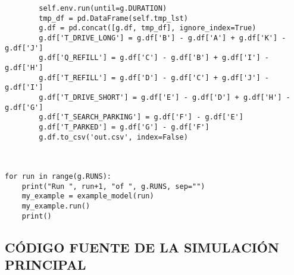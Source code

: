 \begin{verbatim}
        self.env.run(until=g.DURATION)
        tmp_df = pd.DataFrame(self.tmp_lst)
        g.df = pd.concat([g.df, tmp_df], ignore_index=True)
        g.df['T_DRIVE_LONG'] = g.df['B'] - g.df['A'] + g.df['K'] - g.df['J']
        g.df['Q_REFILL'] = g.df['C'] - g.df['B'] + g.df['I'] - g.df['H']
        g.df['T_REFILL'] = g.df['D'] - g.df['C'] + g.df['J'] - g.df['I']
        g.df['T_DRIVE_SHORT'] = g.df['E'] - g.df['D'] + g.df['H'] - g.df['G']
        g.df['T_SEARCH_PARKING'] = g.df['F'] - g.df['E']
        g.df['T_PARKED'] = g.df['G'] - g.df['F']
        g.df.to_csv('out.csv', index=False)



for run in range(g.RUNS):
    print("Run ", run+1, "of ", g.RUNS, sep="")
    my_example = example_model(run)
    my_example.run()
    print()
\end{verbatim}

\newpage

\subsection{CÓDIGO FUENTE DE LA SIMULACIÓN PRINCIPAL}\label{apnd2}


